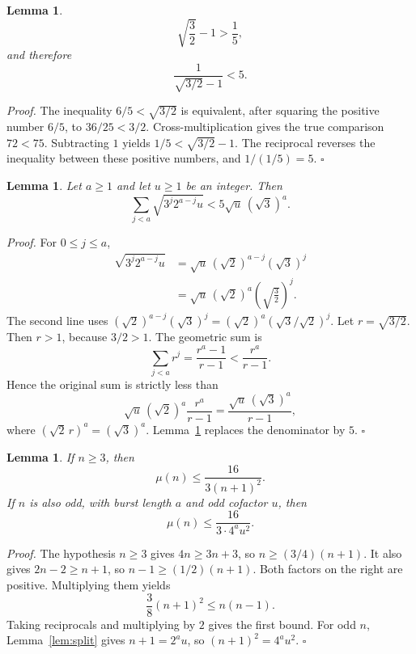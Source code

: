 \documentclass[11pt,letterpaper]{article}
\newtheorem{lemma}[theorem]{Lemma}
\newenvironment{proof}{\noindent\textit{Proof.}}{\hfill\(\square\)}
\begin{document}
\begin{lemma}
\label{lem:five}
\[
\sqrt{\frac{3}{2}}-1>\frac{1}{5},
\]
and therefore
\[
\frac{1}{\sqrt{3/2}-1}<5.
\]
\end{lemma}

\begin{proof}
The inequality \(6/5<\sqrt{3/2}\) is equivalent, after squaring the positive number \(6/5\), to \(36/25<3/2\). Cross-multiplication gives the true comparison \(72<75\). Subtracting \(1\) yields \(1/5<\sqrt{3/2}-1\). The reciprocal reverses the inequality between these positive numbers, and \(1/(1/5)=5\).
\end{proof}

\begin{lemma}
\label{lem:height}
Let \(a\ge 1\) and let \(u\ge 1\) be an integer. Then
\[
\sum_{j<a}\sqrt{3^{j}2^{a-j}u}
<5\sqrt{u}\,(\sqrt{3})^{a}.
\]
\end{lemma}

\begin{proof}
For \(0\le j\le a\),
\begin{align*}
\sqrt{3^{j}2^{a-j}u}
&=\sqrt{u}\,(\sqrt{2})^{a-j}(\sqrt{3})^{j}\\
&=\sqrt{u}\,(\sqrt{2})^{a}
\left(\sqrt{\frac{3}{2}}\right)^{j}.
\end{align*}
The second line uses \((\sqrt{2})^{a-j}(\sqrt{3})^{j}=(\sqrt{2})^{a}(\sqrt{3}/\sqrt{2})^{j}\). Let \(r=\sqrt{3/2}\). Then \(r>1\), because \(3/2>1\). The geometric sum is
\[
\sum_{j<a}r^{j}=\frac{r^{a}-1}{r-1}<\frac{r^{a}}{r-1}.
\]
Hence the original sum is strictly less than
\[
\sqrt{u}\,(\sqrt{2})^{a}\frac{r^{a}}{r-1}
=\frac{\sqrt{u}\,(\sqrt{3})^{a}}{r-1},
\]
where \((\sqrt{2}\,r)^{a}=(\sqrt{3})^{a}\). Lemma~\ref{lem:five} replaces the denominator by \(5\).
\end{proof}

\begin{lemma}
\label{lem:source}
If \(n\ge 3\), then
\[
\mu(n)\le \frac{16}{3(n+1)^{2}}.
\]
If \(n\) is also odd, with burst length \(a\) and odd cofactor \(u\), then
\[
\mu(n)\le \frac{16}{3\cdot 4^{a}u^{2}}.
\]
\end{lemma}

\begin{proof}
The hypothesis \(n\ge 3\) gives \(4n\ge 3n+3\), so \(n\ge (3/4)(n+1)\). It also gives \(2n-2\ge n+1\), so \(n-1\ge (1/2)(n+1)\). Both factors on the right are positive. Multiplying them yields
\[
\frac{3}{8}(n+1)^{2}\le n(n-1).
\]
Taking reciprocals and multiplying by \(2\) gives the first bound. For odd \(n\), Lemma~\ref{lem:split} gives \(n+1=2^{a}u\), so \((n+1)^{2}=4^{a}u^{2}\).
\end{proof}
\end{document}
